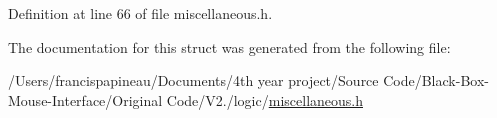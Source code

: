 \-Definition at line 66 of file miscellaneous.\-h.



\-The documentation for this struct was generated from the following file\-:\begin{DoxyCompactItemize}
\item 
/\-Users/francispapineau/\-Documents/4th year project/\-Source Code/\-Black-\/\-Box-\/\-Mouse-\/\-Interface/\-Original Code/\-V2./logic/\hyperlink{miscellaneous_8h}{miscellaneous.\-h}\end{DoxyCompactItemize}
